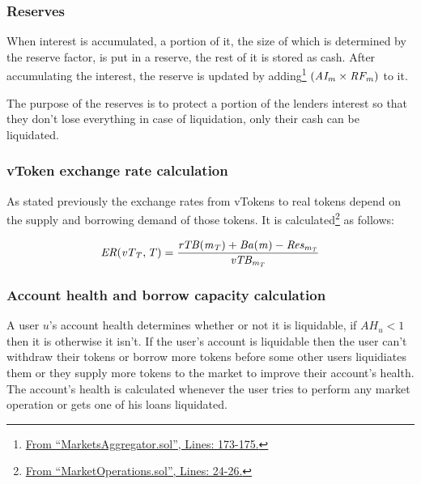 \subsubsection{Reserves}

When interest is accumulated, a portion of it, the size of which is determined by the reserve factor, is put in a reserve, the rest of it is stored as cash. After accumulating the interest, the reserve is updated by adding\footnote{\href{https://github.com/SVOIcom/everscalend-contracts/blob/8d24e268f9c44bd3e896fb6a28bbf8a42c7027a9/smart-contracts/src/Market/MarketsAggregator.sol\#L173-L175}{From ``MarketsAggregator.sol'', Lines: 173-175.}} $(\mathit{AI_{m}} \times \mathit{RF_{m}})$ to it.

The purpose of the reserves is to protect a portion of the lenders interest so that they don't lose everything in case of liquidation, only their cash can be liquidated. %

\subsubsection{vToken exchange rate calculation}

As stated previously the exchange rates from vTokens to real tokens depend on the supply and borrowing demand of those tokens. It is calculated\footnote{\href{https://github.com/SVOIcom/everscalend-contracts/blob/8d24e268f9c44bd3e896fb6a28bbf8a42c7027a9/smart-contracts/src/Market/libraries/MarketOperations.sol\#L24-L26}{From ``MarketOperations.sol'', Lines: 24-26.}} as follows:

$$
  \mathit{ER(\mathit{vT_{T}}, T)} = \frac{\mathit{rTB(\mathit{m_{T}})} + \mathit{Ba(m)} - \mathit{Res_{\mathit{m_{T}}}}}{\mathit{vTB_{\mathit{m_{T}}}}}
$$

\subsubsection{Account health and borrow capacity calculation}

A user $u$'s account health determines whether or not it is liquidable, if $AH_u < 1$ then it is otherwise it isn't. If the user's account is liquidable then the user can't withdraw their tokens or borrow more tokens before some other users liquidiates them or they supply more tokens to the market to improve their account's health. The account's health is calculated whenever the user tries to perform any market operation or gets one of his loans liquidated.

